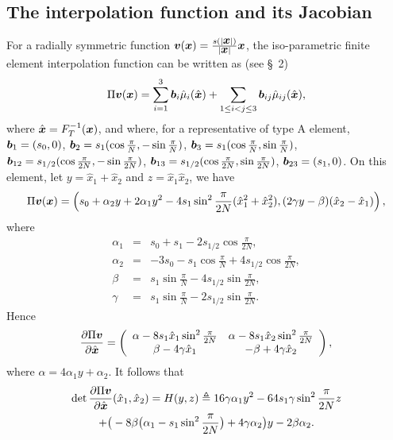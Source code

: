 \documentclass[12pt]{article}
\renewcommand{\vec}[1]{\mbox{\boldmath$#1$}}
\numberwithin{equation}{section}
\begin{document}
\subsection{The interpolation function and its Jacobian }

For a radially symmetric function
$\vec{v}(\vec{x})=\frac{s(|\vec{x}|)}{|\vec{x}|} \vec{x}$, the iso-parametric
finite element interpolation function can be written as (see \S~2)
\begin{equation}
\Pi \vec{v}(\vec{x})=\sum\limits_{i=1}^{3}\vec{b}_i\hat{\mu}_i(\hat{\vec{x}})+
        \sum\limits_{1\leq i<j\leq 3}\vec{b}_{ij}\hat{\mu}_{ij}(\hat{\vec{x}}),
\label{eq deformation}
\end{equation}
where $\hat{\vec{x}}=F_T^{-1}(\vec{x})$, and where, for
a representative of type A element,
$\vec{b}_1=(s_0,0)$,
$\vec{b}_2=s_1(\cos{\frac{\pi}{N}},-\sin{\frac{\pi}{N}})$,
$\vec{b}_3=s_1(\cos{\frac{\pi}{N}},\sin{\frac{\pi}{N}})$,
$\vec{b}_{12}=s_{1/2}(\cos{\frac{\pi}{2N}},-\sin{\frac{\pi}{2N}})$,
$\vec{b}_{13}=s_{1/2}(\cos{\frac{\pi}{2N}},\sin{\frac{\pi}{2N}})$,
$\vec{b}_{23}=(s_1,0)$.
On this element, let $y=\hat{x}_1+\hat{x}_2$ and $z=\hat{x}_1\hat{x}_2$, we have
\begin{equation}\label{PiA}
\Pi \vec{v}(\vec{x})=\left(s_0+\alpha_2 y+2\alpha_1
y^2-4s_1\sin^2{\frac{\pi}{2N}}(\hat{x}_1^2+\hat{x}_2^2),
(2\gamma y-\beta)(\hat{x}_2-\hat{x}_1)\right),
\end{equation}
where
\begin{eqnarray}
\alpha_1 &=&s_0+s_1-2s_{1/2}\cos{\frac{\pi}{2N}}, \label{pAalpha1} \\
\alpha_2&=&-3s_0-s_1\cos{\frac{\pi}{N}}+4s_{1/2}
\cos{\frac{\pi}{2N}}, \label{pAalpha2}\\
\beta&=&s_1 \sin{\frac{\pi}{N}}-4s_{1/2}
\sin{\frac{\pi}{2N}}, \label{pAbeta} \\
\gamma&=&s_1 \sin{\frac{\pi}{N}}-2s_{1/2}
\sin{\frac{\pi}{2N}}.\label{pAgamma}
\end{eqnarray}
Hence
\begin{equation}\label{JacobipA}
\frac{\partial \Pi \vec{v}}{\partial \hat{\vec{x}}}=\left(
\begin{array}{cc}
\alpha-8s_1\hat{x}_1 \sin^2 {\frac{\pi}{2N}} & \alpha-8s_1\hat{x}_2 \sin^2
{\frac{\pi}{2N}} \\
\beta-4\gamma \hat{x}_1 & -\beta+4 \gamma \hat{x}_2 \\
\end{array}
\right),
\end{equation}
where $\alpha=4\alpha_1 y+\alpha_2$. It follows that
\begin{multline}\label{det PipA}
\det \frac{\partial \Pi \vec{v}}{\partial \hat{\vec{x}}}(\hat{x}_1,\hat{x}_2)=
H(y,z)\triangleq
16 \gamma \alpha_1 y^2-64s_1\gamma \sin^2{\frac{\pi}{2N}}z \\ +
\big(-8\beta \big(\alpha_1-s_1\sin^2{\frac{\pi}{2N}}\big)+
4 \gamma \alpha_2\big)y-2\beta \alpha_2.
\end{multline}
\end{document}
